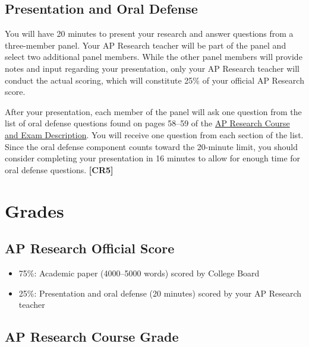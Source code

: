 \documentclass[11pt,]{article}
\providecommand{\tightlist}{%
  \setlength{\itemsep}{0pt}\setlength{\parskip}{0pt}}
\begin{document}
\hypertarget{presentation-and-oral-defense}{%
\subsection{Presentation and Oral Defense}\label{presentation-and-oral-defense}}

You will have 20 minutes to present your research and answer questions from a three-member panel. Your AP Research teacher will be part of the panel and select two additional panel members. While the other panel members will provide notes and input regarding your presentation, only your AP Research teacher will conduct the actual scoring, which will constitute 25\% of your official AP Research score.

After your presentation, each member of the panel will ask one question from the list of oral defense questions found on pages 58--59 of the \href{https://apcentral.collegeboard.org/pdf/ap-research-course-and-exam-description.pdf}{AP Research Course and Exam Description}. You will receive one question from each section of the list. Since the oral defense component counts toward the 20-minute limit, you should consider completing your presentation in 16 minutes to allow for enough time for oral defense questions. \textbf{{[}CR5{]}} 

\hypertarget{grades}{%
\section{Grades}\label{grades}}

\hypertarget{ap-research-official-score}{%
\subsection{AP Research Official Score}\label{ap-research-official-score}}

\begin{itemize}
\tightlist
\item
  75\%: Academic paper (4000--5000 words) scored by College Board
\item
  25\%: Presentation and oral defense (20 minutes) scored by your AP Research teacher
\end{itemize}

\hypertarget{ap-research-course-grade}{%
\subsection{AP Research Course Grade}\label{ap-research-course-grade}}
\end{document}
